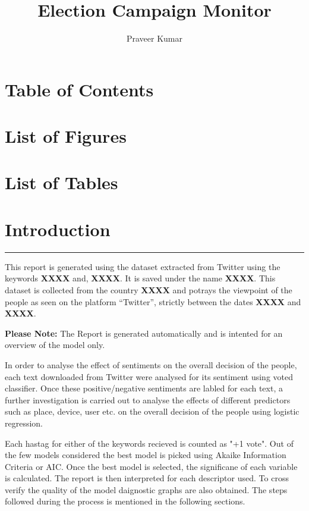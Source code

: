 \documentclass[a4paper,12pt, notitlepage]{article}
\makeatletter
\newcommand*{\toc}{\@starttoc{toc}}{\let\clearpage\relax}
\newcommand*{\lof}{\@starttoc{lof}}{\let\clearpage\relax}
\newcommand*{\lot}{\@starttoc{lot}}{\let\clearpage\relax}
\makeatother
\begin{document}
\title{Election Campaign Monitor}
\author{Praveer Kumar}
\maketitle
\section*{Table of Contents}
\toc
\section*{List of Figures}
\lof
\section*{List of Tables}
\lot

\section{Introduction}
\rule{\textwidth}{0.5pt}
\par
This report is generated using the dataset extracted from Twitter using the keywords \textbf{XXXX} and, \textbf{XXXX}. It is saved under the name \textbf{XXXX}. This dataset is collected from the country \textbf{XXXX} and potrays the viewpoint of the people as seen on the platform ``Twitter'', strictly between the dates \textbf{XXXX} and \textbf{XXXX}.

\begin{mdframed}[hidealllines=true,backgroundcolor=blue!20]
\textbf{Please Note:} The Report is generated automatically and is intented for an overview of the model only.
\end{mdframed}
\par
In order to analyse the effect of sentiments on the overall decision of the people, each text downloaded from Twitter were analysed for its sentiment using voted classifier. Once these positive/negative sentiments are labled for each text, a further investigation is carried out to analyse the effects of different predictors such as place, device, user etc. on the overall decision of the people using logistic regression.
\par
Each hastag for either of the keywords recieved is counted as "+1 vote". Out of the few models considered the best model is picked using Akaike Information Criteria or AIC. Once the best model is selected, the significane of each variable is calculated. The report is then interpreted for each descriptor used. To cross verify the quality of the model daignostic graphs are also obtained. The steps followed during the process is mentioned in the following sections.
\end{document}
